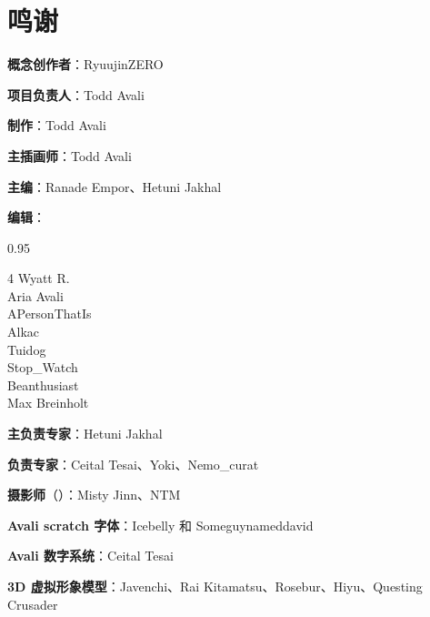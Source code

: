 \section*{鸣谢}

{
\setlength{\parindent}{0pt}
{\textbf{概念创作者}：RyuujinZERO}

{\textbf{项目负责人}：Todd Avali}

{\textbf{制作}：Todd Avali}

{\textbf{主插画师}：Todd Avali}

{\textbf{主编}：Ranade Empor、Hetuni Jakhal}

{\textbf{编辑}：}
\begin{spacing}{0.95}
	\setlength{\multicolsep}{1ex}
	\begin{multicols}{4}
		Wyatt R. \\
		Aria Avali \\
		APersonThatIs \\
		Alkac \\
		Tuidog \\
		Stop\_Watch \\
		Beanthusiast \\
		Max Breinholt
	\end{multicols}
\end{spacing}

{\textbf{主负责专家}：Hetuni Jakhal}

{\textbf{负责专家}：Ceital Tesai、Yoki、Nemo\_curat}

{\textbf{摄影师}（）：Misty Jinn、NTM}

{\textbf{Avali scratch 字体}：Icebelly 和 Someguynameddavid}

{\textbf{Avali 数字系统}：Ceital Tesai}


{\textbf{3D 虚拟形象模型}：Javenchi、Rai Kitamatsu、Rosebur、Hiyu、Questing Crusader}


}
